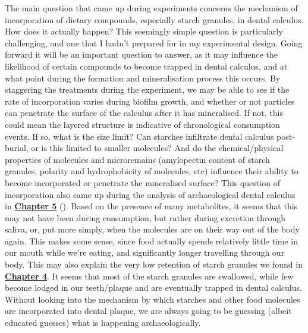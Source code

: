 \documentclass[
  b5paper,
]{book}
\begin{document}
The main question that came up during experiments concerns the mechanism
of incorporation of dietary compounds, especially starch granules, in
dental calculus. How does it actually happen? This seemingly simple
question is particularly challenging, and one that I hadn't prepared for
in my experimental design. Going forward it will be an important
question to answer, as it may influence the likelihood of certain
compounds to become trapped in dental calculus, and at what point during
the formation and mineralisation process this occurs. By staggering the
treatments during the experiment, we may be able to see if the rate of
incorporation varies during biofilm growth, and whether or not particles
can penetrate the surface of the calculus after it has mineralised. If
not, this could mean the layered structure is indicative of
chronological consumption events. If so, what is the size limit? Can
starches infiltrate dental calculus post-burial, or is this limited to
smaller molecules? And do the chemical/physical properties of molecules
and microremains (amylopectin content of starch granules, polarity and
hydrophobicity of molecules, etc) influence their ability to become
incorporated or penetrate the mineralised surface? This question of
incorporation also came up during the analysis of archaeological dental
calculus in \hyperref[mb11CalculusPilot]{\textbf{Chapter 5}}
(). Based on the presence of many metabolites, it seems that
this may not have been during consumption, but rather during excretion
through saliva, or, put more simply, when the molecules are on their way
out of the body again. This makes some sense, since food actually spends
relatively little time in our mouth while we're eating, and
significantly longer travelling through our body. This may also explain
the very low retention of starch granules we found in
\hyperref[byoc-starch]{\textbf{Chapter 4}}. It seems that most of the
starch granules are swallowed, while few become lodged in our
teeth/plaque and are eventually trapped in dental calculus. Without
looking into the mechanism by which starches and other food molecules
are incorporated into dental plaque, we are always going to be guessing
(albeit educated guesses) what is happening archaeologically.
\end{document}
